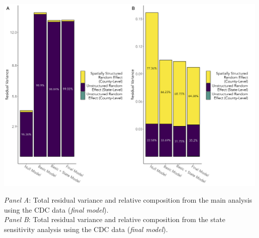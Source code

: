 \documentclass{beamer}
\begin{document}
\begin{frame}
		
\centering
		\vspace*{-0.19 cm}

		\includegraphics[scale=0.09]{images-logos/compare-cdc-res-var.png}
		
	
		
		\tiny{\textit{Panel A}: Total residual variance and relative composition from the main analysis using the CDC data (\textit{final model}).\\
			\textit{Panel B}: Total residual variance and relative composition from the state sensitivity analysis using the CDC data (\textit{final model}).}
			
\end{frame}
\end{document}
